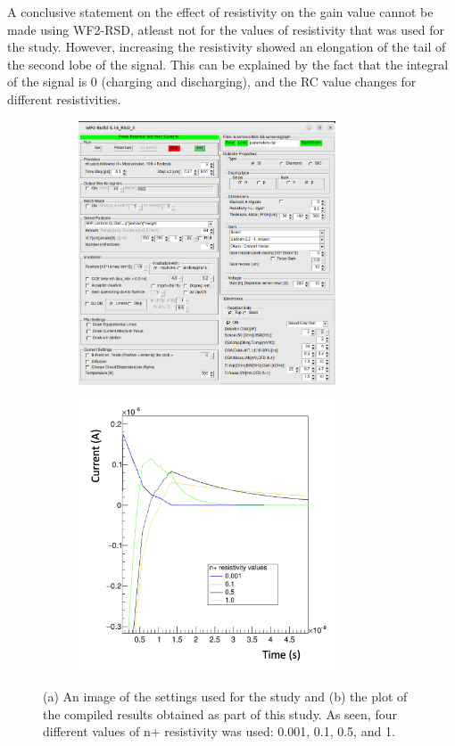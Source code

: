 \documentclass[11pt]{article}
\begin{document}
A conclusive statement on the effect of resistivity on the gain value cannot be made using WF2-RSD, atleast not for the values of resistivity that was used for the study. However, increasing the resistivity showed an elongation of the tail of the second lobe of the signal. This can be explained by the fact that the integral of the signal is 0 (charging and discharging), and the RC value changes for different resistivities.

\begin{figure}[h!]
    \centering
    \begin{subfigure}[t]{0.49\textwidth}
        \centering
        \includegraphics[width=3in]{Images/n_resistivity_other_settings.png}
        \caption{}
        \label{fig:n_resistivity_other_settings}
    \end{subfigure}%
    \begin{subfigure}[t]{0.49\textwidth}
        \centering
        \includegraphics[width=3in]{Images/n_resistivity_plot.png}
        \caption{}
        \label{fig:n_resistivity_plot}
    \end{subfigure}
    \caption{(a) An image of the settings used for the study and (b) the plot of the compiled results obtained as part of this study. As seen, four different values of n+ resistivity was used: 0.001, 0.1, 0.5, and 1.}
\end{figure}
\end{document}
